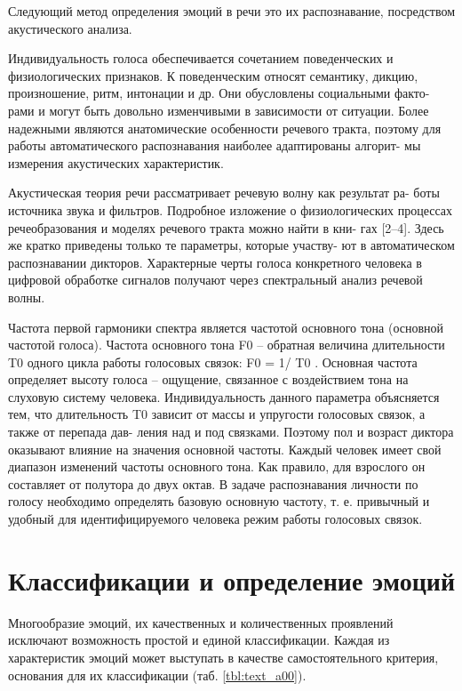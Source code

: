 Следующий метод определения эмоций в речи это их распознавание, посредством акустического анализа.

Индивидуальность голоса обеспечивается сочетанием поведенческих и
физиологических признаков. К поведенческим относят семантику, дикцию,
произношение, ритм, интонации и др. Они обусловлены социальными факто-
рами и могут быть довольно изменчивыми в зависимости от ситуации. Более
надежными являются анатомические особенности речевого тракта, поэтому
для работы автоматического распознавания наиболее адаптированы алгорит-
мы измерения акустических характеристик.

Акустическая теория речи рассматривает речевую волну как результат ра-
боты источника звука и фильтров. Подробное изложение о физиологических
процессах речеобразования и моделях речевого тракта можно найти в кни-
гах [2–4]. Здесь же кратко приведены только те параметры, которые участву-
ют в автоматическом распознавании дикторов.
Характерные черты голоса конкретного человека в цифровой обработке
сигналов получают через спектральный анализ речевой волны.

Частота первой гармоники спектра является частотой основного тона
(основной частотой голоса). Частота основного тона F0 – обратная величина
длительности T0 одного цикла работы голосовых связок: F0 = 1/ T0 . Основная
частота определяет высоту голоса – ощущение, связанное с воздействием тона
на слуховую систему человека.
Индивидуальность данного параметра объясняется тем, что длительность
T0 зависит от массы и упругости голосовых связок, а также от перепада дав-
ления над и под связками. Поэтому пол и возраст диктора оказывают влияние
на значения основной частоты.
Каждый человек имеет свой диапазон изменений частоты основного тона.
Как правило, для взрослого он составляет от полутора до двух октав. В задаче
распознавания личности по голосу необходимо определять базовую основную
частоту, т. е. привычный и удобный для идентифицируемого человека режим
работы голосовых связок.

\section{Классификации и определение эмоций}

Многообразие эмоций, их качественных и количественных проявлений исключают возможность простой и единой классификации. 
Каждая из характеристик эмоций может выступать в качестве самостоятельного критерия, основания для их классификации (таб. \ref{tbl:text_a00}).

